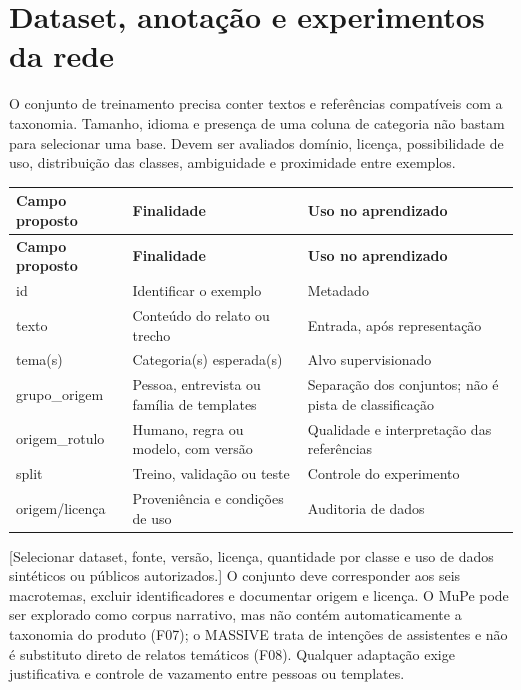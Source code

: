 \documentclass[11pt,a4paper]{article}
\newcommand{\pendencia}[1]{\textcolor{pendente}{[#1]}}
\begin{document}
\section{Dataset, anotação e experimentos da rede}
O conjunto de treinamento precisa conter textos e referências compatíveis com a taxonomia. Tamanho, idioma e presença de uma coluna de categoria não bastam para selecionar uma base. Devem ser avaliados domínio, licença, possibilidade de uso, distribuição das classes, ambiguidade e proximidade entre exemplos.

\begingroup\small
\begin{longtable}{>{\raggedright\arraybackslash}p{}>{\raggedright\arraybackslash}p{}>{\raggedright\arraybackslash}p{}}
\toprule
\textbf{Campo proposto} & \textbf{Finalidade} & \textbf{Uso no aprendizado} \\ \midrule\endfirsthead
\toprule
\textbf{Campo proposto} & \textbf{Finalidade} & \textbf{Uso no aprendizado} \\ \midrule\endhead
\bottomrule\endfoot
id & Identificar o exemplo & Metadado \\[3pt]
texto & Conteúdo do relato ou trecho & Entrada, após representação \\[3pt]
tema(s) & Categoria(s) esperada(s) & Alvo supervisionado \\[3pt]
grupo\_origem & Pessoa, entrevista ou família de templates & Separação dos conjuntos; não é pista de classificação \\[3pt]
origem\_rotulo & Humano, regra ou modelo, com versão & Qualidade e interpretação das referências \\[3pt]
split & Treino, validação ou teste & Controle do experimento \\[3pt]
origem/licença & Proveniência e condições de uso & Auditoria de dados \\[3pt]
\end{longtable}
\endgroup
\pendencia{Selecionar dataset, fonte, versão, licença, quantidade por classe e uso de dados sintéticos ou públicos autorizados.} O conjunto deve corresponder aos seis macrotemas, excluir identificadores e documentar origem e licença. O MuPe pode ser explorado como corpus narrativo, mas não contém automaticamente a taxonomia do produto (F07); o MASSIVE trata de intenções de assistentes e não é substituto direto de relatos temáticos (F08). Qualquer adaptação exige justificativa e controle de vazamento entre pessoas ou templates.
\end{document}
